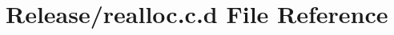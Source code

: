 \hypertarget{_release_2realloc_8c_8d}{\section{\-Release/realloc.c.\-d \-File \-Reference}
\label{_release_2realloc_8c_8d}
}
